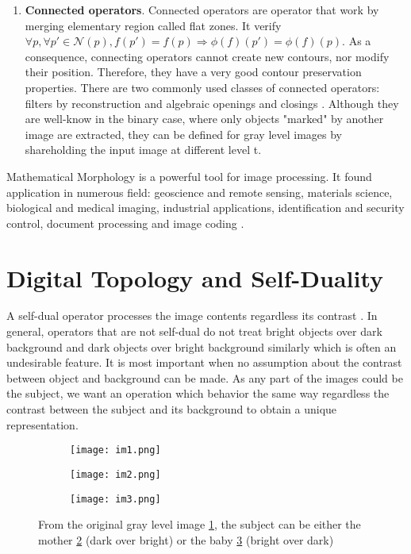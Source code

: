 \begin{enumerate}
\item \textbf{Connected operators}. Connected operators \cite{Salembier95flatzones} are operator that work by merging elementary region called flat zones. It verify 
$ \forall p, \forall p' \in \mathcal{N}(p), f(p')=f(p) \Longrightarrow  \phi(f)(p')=\phi(f)(p)$. As a consequence, connecting operators cannot create new contours, nor modify their position. Therefore, they have a very good contour preservation properties. There are two commonly used classes of connected operators: filters by reconstruction and algebraic openings and closings \cite{Vincent.1993.tip}. Although they are well-know in the binary case, where only objects "marked" by another image are extracted, they can be defined for gray level images by shareholding the input image at different level t.  
\end{enumerate}
\par Mathematical Morphology is a powerful tool for image processing. It found application in numerous field: geoscience and remote sensing, materials science, biological and medical imaging, industrial applications, identification and security control, document processing and image coding \cite{Soille:2003:MIA:773286}.

\section{Digital Topology and Self-Duality}

A self-dual operator processes the image contents regardless its contrast \cite{Geraud.15.ismm}. In general, operators that are not self-dual do not treat bright objects over dark background and dark objects over bright background similarly which is often an undesirable feature. It is most important when no assumption about the contrast between object and background can be made. As any part of the images could be the subject, we want an operation which behavior the same way regardless the contrast between the subject and its background to obtain a unique representation.  
\begin{figure}

	\begin{subfigure}{0.3\textwidth}
	 	\texttt{[image: im1.png]} \caption{}\label{fig:gray} \end{subfigure}
	\begin{subfigure}{0.3\textwidth}
		\texttt{[image: im2.png]} \caption{}\label{fig:mother} \end{subfigure}
	\begin{subfigure}{0.3\textwidth}
		\texttt{[image: im3.png]} \caption{}\label{fig:baby} \end{subfigure}
	\centering
	\caption[Example of \textit{subjects}] {From the original gray level image \ref{fig:gray}, the subject can be either the mother \ref{fig:mother} (dark over bright) or the baby \ref{fig:baby} (bright over dark) }
	\label{fig:motheAndBaby}
\end{figure}

